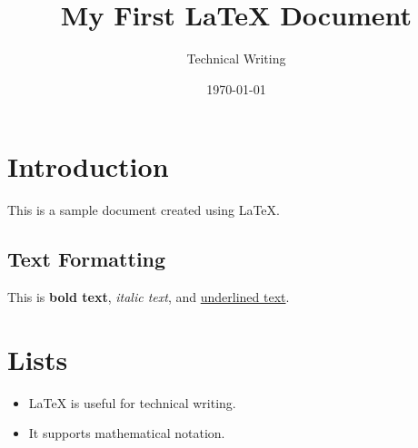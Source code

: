 \documentclass[12pt,a4paper]{article}
\title{My First LaTeX Document}
\author{Technical Writing}
\date{\today}
\begin{document}
\maketitle

\section{Introduction}
This is a sample document created using LaTeX.

\subsection{Text Formatting}
This is \textbf{bold text}, \textit{italic text}, and
\underline{underlined text}.

\section{Lists}
\begin{itemize}
    \item LaTeX is useful for technical writing.
    \item It supports mathematical notation.
\end{itemize}
\end{document}
